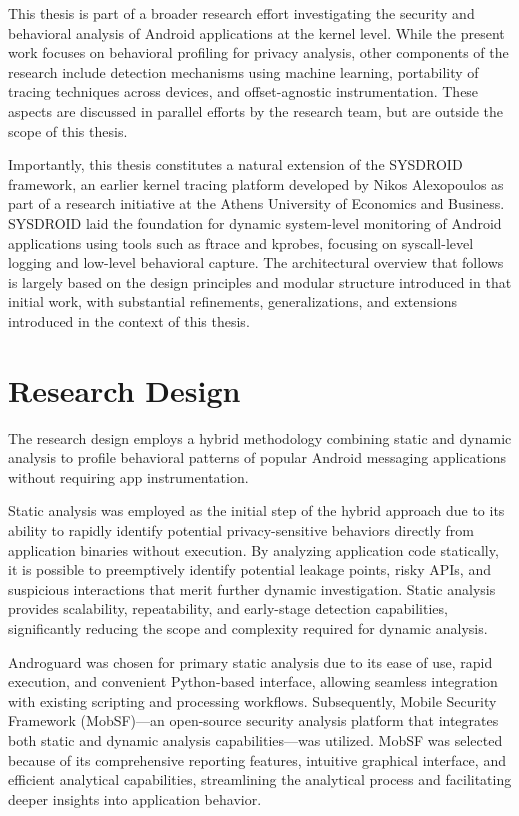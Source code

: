 \documentclass[a4paper,12pt]{report}
\begin{document}
This thesis is part of a broader research effort investigating the security and behavioral analysis of Android applications at the kernel level. While the present work focuses on behavioral profiling for privacy analysis, other components of the research include detection mechanisms using machine learning, portability of tracing techniques across devices, and offset-agnostic instrumentation. These aspects are discussed in parallel efforts by the research team, but are outside the scope of this thesis.

Importantly, this thesis constitutes a natural extension of the SYSDROID framework, an earlier kernel tracing platform developed by Nikos Alexopoulos as part of a research initiative at the Athens University of Economics and Business. SYSDROID laid the foundation for dynamic system-level monitoring of Android applications using tools such as ftrace and kprobes, focusing on syscall-level logging and low-level behavioral capture. The architectural overview that follows is largely based on the design principles and modular structure introduced in that initial work, with substantial refinements, generalizations, and extensions introduced in the context of this thesis.

\section{Research Design}

The research design employs a hybrid methodology combining static and dynamic analysis to profile behavioral patterns of popular Android messaging applications without requiring app instrumentation.

Static analysis was employed as the initial step of the hybrid approach due to its ability to rapidly identify potential privacy-sensitive behaviors directly from application binaries without execution. By analyzing application code statically, it is possible to preemptively identify potential leakage points, risky APIs, and suspicious interactions that merit further dynamic investigation. Static analysis provides scalability, repeatability, and early-stage detection capabilities, significantly reducing the scope and complexity required for dynamic analysis.

Androguard was chosen for primary static analysis due to its ease of use, rapid execution, and convenient Python-based interface, allowing seamless integration with existing scripting and processing workflows. Subsequently, Mobile Security Framework (MobSF)—an open-source security analysis platform that integrates both static and dynamic analysis capabilities—was utilized. MobSF was selected because of its comprehensive reporting features, intuitive graphical interface, and efficient analytical capabilities, streamlining the analytical process and facilitating deeper insights into application behavior.
\end{document}
